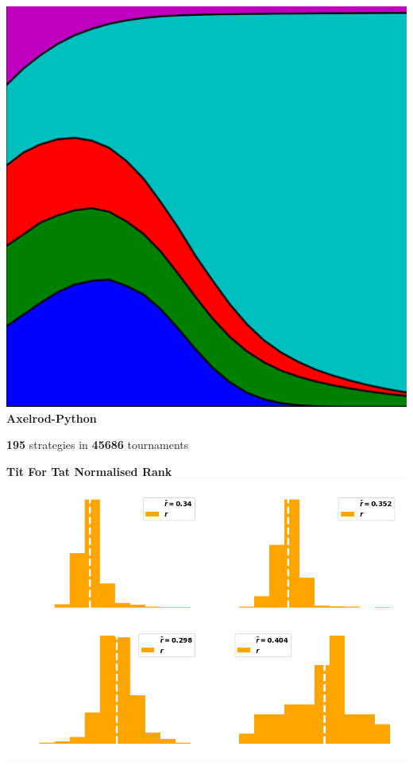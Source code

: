 \documentclass{beamer}
\begin{document}
\begin{frame}
    \begin{center}
        \includegraphics[width=.25\textwidth]{static/axelrod-logo.png} \\
        \textbf{Axelrod-Python}
    \end{center}
\end{frame}

\begin{frame}
    \begin{center}
    \Large{\textbf{195}} \small{strategies in} \Large{\textbf{45686}} \small{tournaments}
    \end{center}
\end{frame}

\begin{frame}
    \begin{center}
        \textbf{Tit For Tat Normalised Rank} \\ \vspace{1cm}
        \includegraphics[width=.8\textwidth]{static/tit_for_tat_r_distributions.png} 
    \end{center}
\end{frame}
\end{document}
